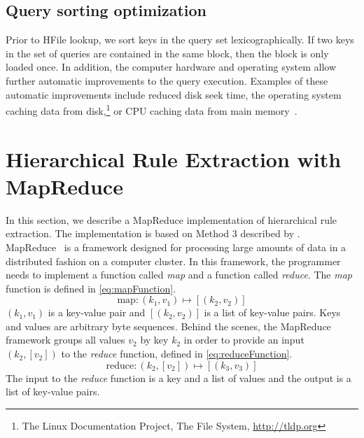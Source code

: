 \subsection{Query sorting optimization}

Prior to HFile lookup, we sort keys in the query set lexicographically. If two
keys in the set of queries are contained in the same block, then the block is
only loaded once. In addition, the computer hardware and operating system allow
further automatic improvements to the query execution. Examples of these
automatic improvements include reduced disk seek time, the operating system
caching data from
disk,\footnote{The Linux Documentation Project, The File System, \url{http://tldp.org}}
or CPU caching data from main memory~\citep{patterson-hennessy:2005:COA}.

\section{Hierarchical Rule Extraction with MapReduce}

In this section, we describe a MapReduce implementation of hierarchical rule
extraction. The implementation is based on Method 3 described by
\citet{dyer-cordova-mont-lin:2008:WMT}.
MapReduce~\citep{dean-ghemawat:2008:ACM} is a framework designed for processing
large amounts of data in a distributed fashion on a computer cluster. In this
framework, the programmer needs to implement a function called \emph{map} and
a function called \emph{reduce}. The \emph{map} function is defined in
\autoref{eq:mapFunction}.
%
\begin{equation}
  \text{map} : (k_1, v_1) \longmapsto [(k_2, v_2)]
  \label{eq:mapFunction}
\end{equation}
%
$(k_1, v_1)$ is a key-value pair and $[(k_2, v_2)]$ is a list of
key-value pairs. Keys and values are arbitrary byte sequences. Behind the
scenes, the MapReduce framework groups all values $v_2$ by key $k_2$ in order
to provide an input $(k_2, [v_2])$ to the \emph{reduce} function, defined in
\autoref{eq:reduceFunction}.
%
\begin{equation}
  \text{reduce} : (k_2, [v_2]) \longmapsto [(k_3, v_3)]
  \label{eq:reduceFunction}
\end{equation}
%
The input to the \emph{reduce} function is a key and a list of values and the
output is a list of key-value pairs.

